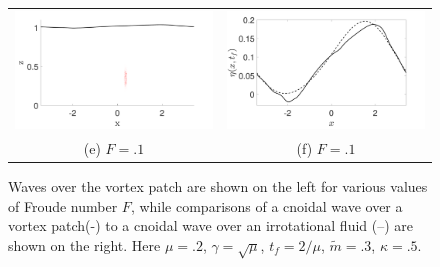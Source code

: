 \documentclass[a4paper,11pt]{article}
\begin{document}
\begin{figure}
\begin{tabular}{cc}
\includegraphics[width=.35\textwidth]{wave_over_vortices_m_pt3_w0_10} & \includegraphics[width=.35\textwidth]{profiles_m_pt3_w0_10}\\
(e)  $F=.1$ & (f)  $F=.1$
\end{tabular}
\caption{Waves over the vortex patch are shown on the left for various values of Froude number $F$, while comparisons of a cnoidal wave over a vortex patch(-) to a cnoidal wave over an irrotational fluid (--) are shown on the right.  Here $\mu=.2$, $\gamma=\sqrt{\mu}$, $t_{f}=2/\mu$, $\tilde{m}=.3$, $\kappa = .5$.}
\label{fig:lowsolwave}
\end{figure}
\end{document}
